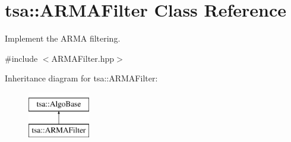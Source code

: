 \hypertarget{classtsa_1_1_a_r_m_a_filter}{}\section{tsa\+:\+:A\+R\+M\+A\+Filter Class Reference}
\label{classtsa_1_1_a_r_m_a_filter}


Implement the A\+R\+MA filtering.  




{\ttfamily \#include $<$A\+R\+M\+A\+Filter.\+hpp$>$}

Inheritance diagram for tsa\+:\+:A\+R\+M\+A\+Filter\+:\begin{figure}[H]
\begin{center}
\leavevmode
\includegraphics[height=2.000000cm]{classtsa_1_1_a_r_m_a_filter}
\end{center}
\end{figure}

